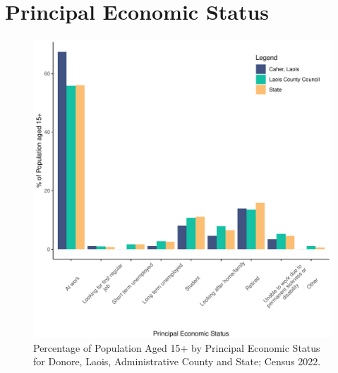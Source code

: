 \documentclass{article}
\begin{document}
  
\pagebreak
\section{Principal Economic Status}\label{sect:PES}
\begin{figure}[H]
	\centering
	\includegraphics[width = 140mm]{../figures/PESED.pdf}
	\caption{Percentage of Population Aged 15+ by Principal Economic Status for Donore, Laois, Administrative County and State; Census 2022.}
	\label{fig:vbnv}
	\end{figure}
\end{document}
